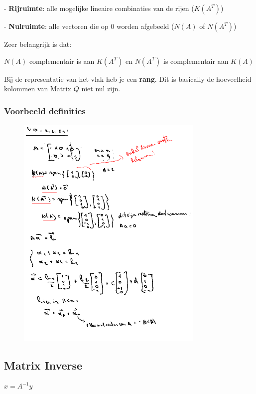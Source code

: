 \documentclass[a4paper]{report}
\begin{document}
- \textbf{Rijruimte}: alle mogelijke lineaire combinaties van de rijen ($K(A^T)$)

- \textbf{Nulruimte}: alle vectoren die op 0 worden afgebeeld ($N(A)$ of $N(A^T)$)

Zeer belangrijk is dat:

$N(A)$ complementair is aan $K(A^T)$ en $N(A^T)$ is complementair aan $K(A)$

Bij de representatie van het vlak heb je een \textbf{rang}. Dit is basically de hoeveelheid kolommen van Matrix $Q$ niet nul zijn.

\subsubsection{Voorbeeld definities}

\begin{figure}[H]
	\centering
	\includegraphics[width=0.8\textwidth]{assets/kolom_rij_null.png}
	\caption{}
	\label{fig:kolom_rij_null}
\end{figure}

\subsection{Matrix Inverse}

$x = A^{-1} y$
\end{document}
